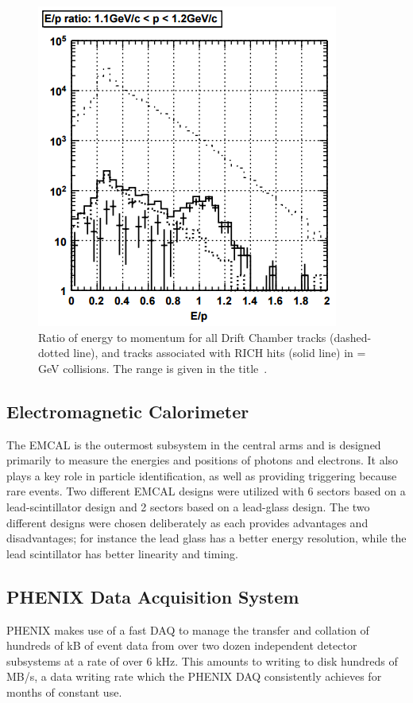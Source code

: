 \begin{figure}[!ht]
\begin{center}
\includegraphics[width=0.55\linewidth]{figs/e_over_p_rich_discrimination.png}
\caption{Ratio of energy to momentum for all Drift Chamber tracks (dashed-dotted line), and tracks associated with RICH hits (solid line) in \auau =  GeV collisions. The \pt range is given in the title~\cite{Aizawa2003508}.}
\label{fig:rich_discrim_ep}
\end{center}
\end{figure}

\subsection{Electromagnetic Calorimeter}
The EMCAL is the outermost subsystem in the central arms and is designed primarily to measure the energies and positions of photons and electrons. It also plays a key role in particle identification, as well as providing triggering because rare events. Two different EMCAL designs were utilized with 6 sectors based on a lead-scintillator design and 2 sectors based on a lead-glass design. The two different designs were chosen deliberately as each provides advantages and disadvantages; for instance the lead glass has a better energy resolution, while the lead scintillator has better linearity and timing.
\subsection{PHENIX Data Acquisition System}
\label{sec:PHENIX_DAQ}
PHENIX makes use of a fast DAQ to manage the transfer and collation of hundreds of kB of event data from over two dozen independent detector subsystems at a rate of over 6 kHz. This amounts to writing to disk hundreds of MB/s, a data writing rate which the PHENIX DAQ consistently achieves for months of constant use. 

